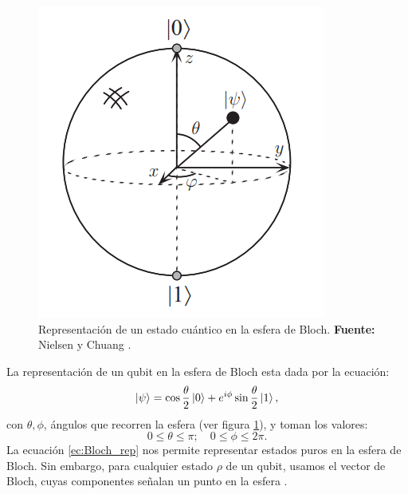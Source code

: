 \documentclass[letterpaper,12pt]{thesisECFM}
\theoremstyle{plain}
\theoremstyle{definition}
\theoremstyle{definition}
\theoremstyle{remark}
\newcommand{\1}{\mathbb{1}}
\begin{document}
\begin{figure}[h]
    \centering
    \includegraphics[scale=0.70]{imagenes/Bloch.png}
    \caption{Representación de un estado cuántico en la esfera de Bloch.
\textbf{Fuente:} Nielsen y Chuang \cite{nielsen_chuang_2011}.}
    \label{fig:Bloch}
\end{figure}
La representación de un qubit en la esfera de Bloch esta dada por la ecuación: 
\begin{equation}
    \label{ec:Bloch_rep}
    \ket{\psi} = \cos{\frac{\theta}{2}}\ket{0}+ e^{i\phi}\sin{\frac{\theta}{2}}\ket{1},
\end{equation}
con $\theta,\phi$,  ángulos que recorren la esfera (ver figura \ref{fig:Bloch}), y toman los valores:
\begin{equation}
 0 \leq \theta \leq \pi ;  \quad   0 \leq \phi \leq 2\pi.
\end{equation} 
La ecuación \ref{ec:Bloch_rep} nos permite representar estados puros en la esfera de Bloch. Sin embargo, para cualquier estado $\rho$ de un qubit, usamos el vector de Bloch, cuyas componentes señalan un punto en la esfera \cite{princip_quantum}.
\end{document}
